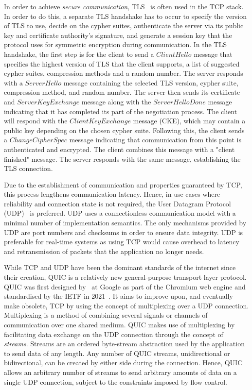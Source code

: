 In order to achieve \textit{secure communication}, TLS~\citep{rescorla_transport_2018} is often used in the TCP stack.
In order to do this, a separate TLS handshake has to occur to specify the version of TLS to use, decide on the cypher suites, authenticate the server via its public key and certificate authority's signature, and generate a session key that the protocol uses for symmetric encryption during communication.
In the TLS handshake, the first step is for the client to send a $ClientHello$ message that specifies the highest version of TLS that the client supports, a list of suggested cypher suites, compression methods and a random number.
The server responds with a $ServerHello$ message containing the selected TLS version, cypher suite, compression method, and random number.
The server then sends its certificate and $ServerKeyExchange$ message along with the $ServerHelloDone$ message indicating that it has completed its part of the negotiation process.
The client will respond with the $ClientKeyExchange$ message (CKE), which may contain a public key depending on the chosen cypher suite.
Following this, the client sends a $ChangeCipherSpec$ message indicating that communication from this point is authenticated and encrypted.
The client combines this message with a "client finished" message.
The server responds with the same message, establishing the TLS connection.

Due to the establishment of communication and properties guaranteed by TCP, this process lengthens communication latency.
Hence, in use-cases where reliability and connection state is not required, the User Datagram Protocol (UDP)~\citep{j_postel_1980} is preferred.
UDP uses a connectionless communication model with a minimal number of implementation semantics.
The only mechanisms provided by UDP are port numbers and checksums in order to ensure data integrity.
UDP is preferable for real-time systems as using TCP would cause overhead to latency and retransmission of packets that the application no longer needs.

While TCP and UDP have been the dominant standards of the internet since their creation, QUIC is a relatively new general-purpose transport layer protocol. QUIC was first designed by~\citet{jim_roskind_2012} at Google as part of the Chromium web engine and standardised by the IETF in 2021~\citep{iyengar_quic_2021}.
It aims to improve upon, and eventually make obsolete, TCP by using the concept of multiplexing over a UDP connection.
Multiplexing is a method of combining several signals or channels of communication over one shared medium.
QUIC makes use of multiplexing by facilitating data exchange on the UDP connection through the concept of \textit{streams}.
Streams are an ordered byte-stream abstraction used by the application to send data of any length.
Any number of QUIC streams, unidirectional or bidirectional, can be created by either side during the connection.
Hence, QUIC allows an arbitrary number of streams to send arbitrary amounts of data on a single UDP connection, subject to the constraints imposed by flow control.

